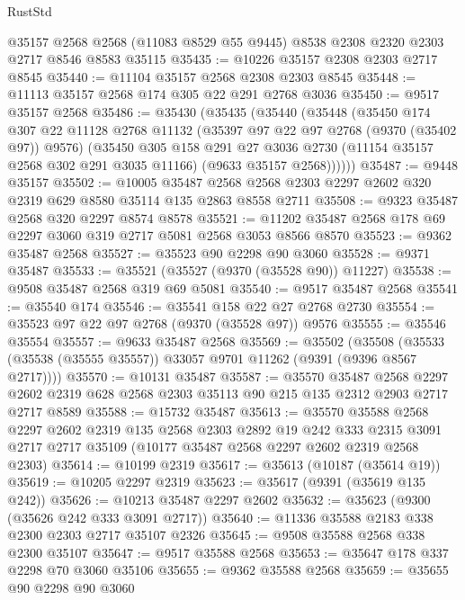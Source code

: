\begin{lexlean}{RustStd}
\begin{coremodule}
    @35157
    @2568
    @2568
    (@11083 @8529 @55 @9445)
    @8538
    @2308
    @2320
    @2303
    @2717
    @8546
    @8583
    @35115
@35435 := @10226 @35157 @2308 @2303 @2717 @8545
@35440 := @11104 @35157 @2568 @2308 @2303 @8545
@35448 := @11113 @35157 @2568 @174 @305 @22 @291 @2768 @3036
@35450 := @9517 @35157 @2568
@35486 := @35430
    (@35435
      (@35440
        (@35448
          (@35450
            @174
            @307
            @22
            @11128
            @2768
            @11132
            (@35397 @97 @22 @97 @2768 (@9370 (@35402 @97)) @9576)
            (@35450
              @305
              @158
              @291
              @27
              @3036
              @2730
              (@11154 @35157 @2568 @302 @291 @3035 @11166)
              (@9633 @35157 @2568))))))
@35487 := @9448 @35157
@35502 := @10005
    @35487
    @2568
    @2568
    @2303
    @2297
    @2602
    @320
    @2319
    @629
    @8580
    @35114
    @135
    @2863
    @8558
    @2711
@35508 := @9323 @35487 @2568 @320 @2297 @8574 @8578
@35521 := @11202 @35487 @2568 @178 @69 @2297 @3060 @319 @2717 @5081 @2568 @3053 @8566 @8570
@35523 := @9362 @35487 @2568
@35527 := @35523 @90 @2298 @90 @3060
@35528 := @9371 @35487
@35533 := @35521 (@35527 (@9370 (@35528 @90)) @11227)
@35538 := @9508 @35487 @2568 @319 @69 @5081
@35540 := @9517 @35487 @2568
@35541 := @35540 @174
@35546 := @35541 @158 @22 @27 @2768 @2730
@35554 := @35523 @97 @22 @97 @2768 (@9370 (@35528 @97)) @9576
@35555 := @35546 @35554
@35557 := @9633 @35487 @2568
@35569 := @35502
    (@35508 (@35533 (@35538 (@35555 @35557)) @33057 @9701 @11262 (@9391 (@9396 @8567 @2717))))
@35570 := @10131 @35487
@35587 := @35570
    @35487
    @2568
    @2297
    @2602
    @2319
    @628
    @2568
    @2303
    @35113
    @90
    @215
    @135
    @2312
    @2903
    @2717
    @2717
    @8589
@35588 := @15732 @35487
@35613 := @35570
    @35588
    @2568
    @2297
    @2602
    @2319
    @135
    @2568
    @2303
    @2892
    @19
    @242
    @333
    @2315
    @3091
    @2717
    @2717
    @35109
    (@10177 @35487 @2568 @2297 @2602 @2319 @2568 @2303)
@35614 := @10199 @2319
@35617 := @35613 (@10187 (@35614 @19))
@35619 := @10205 @2297 @2319
@35623 := @35617 (@9391 (@35619 @135 @242))
@35626 := @10213 @35487 @2297 @2602
@35632 := @35623 (@9300 (@35626 @242 @333 @3091 @2717))
@35640 := @11336 @35588 @2183 @338 @2300 @2303 @2717 @35107 @2326
@35645 := @9508 @35588 @2568 @338 @2300 @35107
@35647 := @9517 @35588 @2568
@35653 := @35647 @178 @337 @2298 @70 @3060 @35106
@35655 := @9362 @35588 @2568
@35659 := @35655 @90 @2298 @90 @3060

\end{coremodule}
\end{lexlean}
